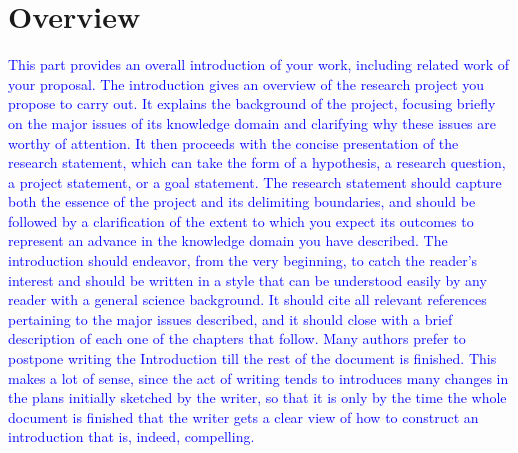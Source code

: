
\chapter{Overview}
\label{ch:intro}

\textcolor{blue}{
This part provides an overall introduction of your work, including
related work of your proposal.
The introduction gives an overview of the research project you propose to carry out. It 
explains the background of the project, focusing briefly on the major issues of its 
knowledge domain and clarifying why these issues are worthy of attention. It then 
proceeds with the concise presentation of the research statement, which can take the 
form of a hypothesis, a research question, a project statement, or a goal statement. The 
research statement should capture both the essence of the project and its delimiting 
boundaries, and should be followed by a clarification of the extent to which you expect 
its outcomes to represent an advance in the knowledge domain you have described. 
The introduction should endeavor, from the very beginning, to catch the reader's 
interest and should be written in a style that can be understood easily by any reader with 
a general science background. It should cite all relevant references pertaining to the 
major issues described, and it should close with a brief description of each one of the 
chapters that follow. 
Many authors prefer to postpone writing the Introduction till the rest of the document is 
finished. This makes a lot of sense, since the act of writing tends to introduces many 
changes in the plans initially sketched by the writer, so that it is only by the time the 
whole document is finished that the writer gets a clear view of how to construct an 
introduction that is, indeed, compelling. }

